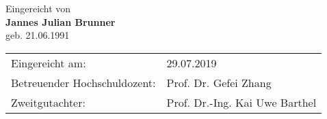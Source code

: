 \documentclass[12pt,a4paper,bibtotoc,pointlessnumbers]{scrartcl}
\begin{document}
\begin{titlepage}
\begin{center}
			{\doublespacing Eingereicht von\\
			{\Large \bf Jannes Julian Brunner}\\ geb. 21.06.1991}
			
		
			\large
			\begin{table}[b]
				\begin{center}
					\begin{tabular}{ll}
					Eingereicht am:& 29.07.2019\\
					Betreuender Hochschuldozent:& Prof. Dr. Gefei Zhang\\
					Zweitgutachter: & Prof. Dr.-Ing. Kai Uwe Barthel\\
					\end{tabular}
				\end{center}
			\end{table} 
		\end{center}
		\vspace{0.6cm}
\end{titlepage}

\newpage





\setcounter{page}{10}


\newpage

\cfoot{\pagemark}
\tableofcontents 
\newpage







\pagestyle{fancy}
\fancyhf{}
\renewcommand{\headrulewidth}{0.4pt} %
\renewcommand{\sectionmark}[1]{%
	\markboth{\thesection.\ #1}{}} %


\fancyhead[L]{\textsl{\small 
		\rightmark}}
\fancyhead[R]{\textsl{\small \thepage}}
\end{document}
